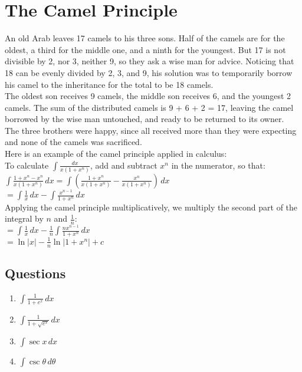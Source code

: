 \documentclass[../main.tex]{subfiles}
\begin{document}
\section{The Camel Principle}
An old Arab leaves 17 camels to his three sons. Half of the camels are for the oldest, a third for the middle one, and a ninth for the youngest. But 17 is not divisible by 2, nor 3, neither 9, so they ask a wise man for advice. Noticing that 18 can be evenly divided by 2, 3, and 9, his solution was to temporarily borrow his camel to the inheritance for the total to be 18 camels.\\

The oldest son receives 9 camels, the middle son receives 6, and the youngest 2 camels. The sum of the distributed camels is 9 + 6 + 2 = 17, leaving the camel borrowed by the wise man untouched, and ready to be returned to its owner.\\

The three brothers were happy, since all received more than they were expecting and none of the camels was sacrificed.\\

Here is an example of the camel principle applied in calculus:\\
To calculate \(\int \frac{dx}{x(1+x^n)}\), add and subtract \(x^n\) in the numerator, so that:\\

\(\int \frac{1+x^n-x^n}{x(1+x^n)}\,dx=\int (\frac{1+x^n}{x(1+x^n)}-\frac{x^n}{x(1+x^n)})\,dx\)\\

\(=\int \frac{1}{x}\,dx-\int \frac{x^{n-1}}{1+x^n}\,dx\)\\

Applying the camel principle multiplicatively, we multiply the second part of the integral by \(n\) and \(\frac{1}{n}\):\\

\(=\int \frac{1}{x}\,dx-\frac{1}{n}\int \frac{nx^{n-1}}{1+x^n}\,dx\)\\

\(=\ln{|x|}-\frac{1}{n}\ln{|1+x^n|}+c\)\\

\pagebreak

\subsection*{Questions}
\label{Camel Principle}

\begin{enumerate}
    \item \(\int \frac{1}{1+e^x}\,dx\)\\
    
    \item \(\int \frac{1}{1+\sqrt{e^x}}\,dx\)\\
    
    \item \(\int \sec{x}\,dx\)\\
    
    \item \(\int \csc{\theta}\,d\theta\)

\end{enumerate}
\end{document}
